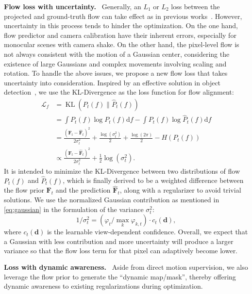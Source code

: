 \documentclass[runningheads]{llncs}
\newcommand{\parsection}[1]{\noindent\textbf{#1.}~}
\begin{document}
\parsection{Flow loss with uncertainty}
%
Generally, an $L_1$ or $L_2$ loss between the projected and ground-truth flow can take effect as in previous works~\cite{nsff,chen2023bidirectional}. However, uncertainty in this process tends to hinder the optimization. On the one hand, flow predictor and camera calibration have their inherent errors, especially for monocular scenes with camera shake. On the other hand, the pixel-level flow is not always consistent with the motion of a Gaussian center, considering the existence of large Gaussians and complex movements involving scaling and rotation. To handle the above issues, we propose a new flow loss that takes uncertainty into consideration. Inspired by an effective solution in object detection~\cite{he2019bounding}, we use the KL-Divergence as the loss function for flow alignment:
%
\begin{equation}
    \begin{aligned}
    \mathcal{L}_{f} 
    & =\operatorname{KL}(P_t(f) \| \hat{P}_t(f)) \\
    & =\int P_t(f) \log P_t(f) \mathrm{d} f-\int P_t(f) \log \hat{P}_t(f) \mathrm{d} f \\
    & =\frac{(\mathbf{F}_t-\hat{\mathbf{F}}_t)^2}{2 \sigma_t^2}+\frac{\log \left(\sigma_t^2\right)}{2}+\frac{\log (2 \pi)}{2}-H\left(P_t(f)\right) \\
    & \propto \frac{(\mathbf{F}_t-\hat{\mathbf{F}}_t)^2}{2 \sigma_t^2}+\frac{1}{2} \log \left(\sigma_t^2\right).
    \end{aligned}
\end{equation}
%
It is intended to minimize the KL-Divergence between two distributions of flow $P_t(f)$ and $\hat{P}_t(f)$, which is finally derived to be a weighted difference between the flow prior $\mathbf{F}_t$ and the prediction $\hat{\mathbf{F}}_t$, along with a regularizer to avoid trivial solutions. We use the normalized Gaussian contribution as mentioned in \cref{eq:gaussian} in the formulation of the variance $\sigma_t^2$:
%
\begin{equation}
    1 / \sigma_t^2 = (\varphi_t / \max_k{\varphi_{k,t}}) \cdot c_t(\mathbf{d}),
\end{equation}
%
where $c_t(\mathbf{d})$ is the learnable view-dependent confidence. Overall, we expect that a Gaussian with less contribution and more uncertainty will produce a larger variance so that the flow loss term for that pixel can adaptively become lower.


\parsection{Loss with dynamic awareness}
%
Aside from direct motion supervision, we also leverage the flow prior to generate the ``dynamic map/mask'', thereby offering dynamic awareness to existing regularizations during optimization.
\end{document}
